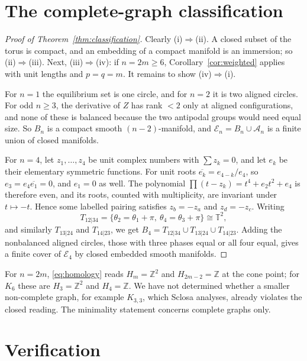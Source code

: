 \documentclass[11pt,a4paper]{article}
\theoremstyle{definition}\newtheorem{conjecture}{Conjecture}
\theoremstyle{remark}\newtheorem{remark}[theorem]{Remark}
\newcommand{\T}{\mathbb T}
\newcommand{\Z}{\mathbb Z}
\newcommand{\E}{\mathcal E}
\begin{document}
\section{The complete-graph classification}\label{sec:classification}

\begin{proof}[Proof of Theorem~\ref{thm:classification}]
Clearly (i)$\Rightarrow$(ii). A closed subset of the torus is compact, and an embedding of a compact manifold is an immersion; so (ii)$\Rightarrow$(iii). Next, (iii)$\Rightarrow$(iv): if $n=2m\ge6$, Corollary~\ref{cor:weighted} applies with unit lengths and $p=q=m$. It remains to show (iv)$\Rightarrow$(i).

For $n=1$ the equilibrium set is one circle, and for $n=2$ it is two aligned circles. For odd $n\ge3$, the derivative of $Z$ has rank $<2$ only at aligned configurations, and none of these is balanced because the two antipodal groups would need equal size. So $B_n$ is a compact smooth $(n-2)$-manifold, and $\E_n=B_n\cup\mathcal A_n$ is a finite union of closed manifolds.

For $n=4$, let $z_1,\dots,z_4$ be unit complex numbers with $\sum z_k=0$, and let $e_k$ be their elementary symmetric functions. For unit roots $\overline{e_k}=e_{4-k}/e_4$, so $e_3=e_4\overline{e_1}=0$, and $e_1=0$ as well. The polynomial $\prod(t-z_k)=t^4+e_2t^2+e_4$ is therefore even, and its roots, counted with multiplicity, are invariant under $t\mapsto-t$. Hence some labelled pairing satisfies $z_b=-z_a$ and $z_d=-z_c$. Writing
\[
 T_{12|34}=\{\theta_2=\theta_1+\pi,\ \theta_4=\theta_3+\pi\}\cong\T^2,
\]
and similarly $T_{13|24}$ and $T_{14|23}$, we get $B_4=T_{12|34}\cup T_{13|24}\cup T_{14|23}$. Adding the nonbalanced aligned circles, those with three phases equal or all four equal, gives a finite cover of $\E_4$ by closed embedded smooth manifolds.
\end{proof}

For $n=2m$, \eqref{eq:homology} reads $H_m=\Z^2$ and $H_{2m-2}=\Z$ at the cone point; for $K_6$ these are $H_3=\Z^2$ and $H_4=\Z$. We have not determined whether a smaller non-complete graph, for example $K_{3,3}$, which Sclosa analyses, already violates the closed reading. The minimality statement concerns complete graphs only.

\section{Verification}\label{sec:verification}
\end{document}
